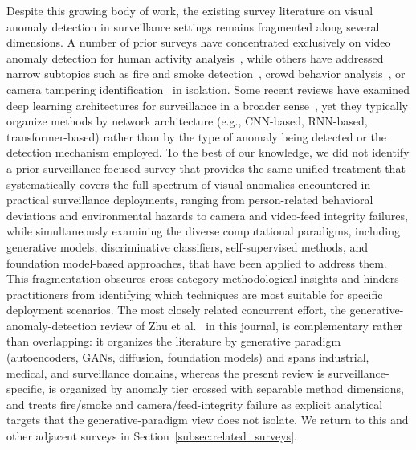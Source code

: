 \documentclass[10pt,a4paper]{article}
\begin{document}
Despite this growing body of work, the existing survey literature on visual anomaly detection in surveillance settings remains fragmented along several dimensions. A number of prior surveys have concentrated exclusively on video anomaly detection for human activity analysis~\citep{ramachandra2020survey, nayak2021comprehensive, wu2024deep_review}, while others have addressed narrow subtopics such as fire and smoke detection~\citep{wang2022deep_fire}, crowd behavior analysis~\citep{li2015crowded}, or camera tampering identification~\citep{mantini2023feature_survey} in isolation. Some recent reviews have examined deep learning architectures for surveillance in a broader sense~\citep{patrikar2022anomaly, tran2024anomaly_images_videos}, yet they typically organize methods by network architecture (e.g., CNN-based, RNN-based, transformer-based) rather than by the type of anomaly being detected or the detection mechanism employed. To the best of our knowledge, we did not identify a prior surveillance-focused survey that provides the same unified treatment that systematically covers the full spectrum of visual anomalies encountered in practical surveillance deployments, ranging from person-related behavioral deviations and environmental hazards to camera and video-feed integrity failures, while simultaneously examining the diverse computational paradigms, including generative models, discriminative classifiers, self-supervised methods, and foundation model-based approaches, that have been applied to address them. This fragmentation obscures cross-category methodological insights and hinders practitioners from identifying which techniques are most suitable for specific deployment scenarios. The most closely related concurrent effort, the generative-anomaly-detection review of Zhu et al.~\citeyearpar{zhu2026generative} in this journal, is complementary rather than overlapping: it organizes the literature by generative paradigm (autoencoders, GANs, diffusion, foundation models) and spans industrial, medical, and surveillance domains, whereas the present review is surveillance-specific, is organized by anomaly tier crossed with separable method dimensions, and treats fire/smoke and camera/feed-integrity failure as explicit analytical targets that the generative-paradigm view does not isolate. We return to this and other adjacent surveys in Section~\ref{subsec:related_surveys}.
\end{document}
